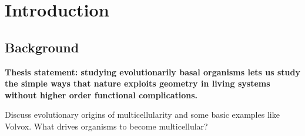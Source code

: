 
\chapter{Introduction} %

\ifpdf
    \graphicspath{{Chapter1/Figs/Raster/}{Chapter1/Figs/PDF/}{Chapter1/Figs/}}
\else
    \graphicspath{{Chapter1/Figs/Vector/}{Chapter1/Figs/}}
\fi


\section{Background} %

\textbf{Thesis statement: studying evolutionarily basal organisms lets us study the simple ways that nature exploits geometry in living systems without higher order functional complications.}

\begin{comment}

\nomenclature[z-cif]{$CIF$}{Cauchy's Integral Formula}                                %
\nomenclature[a-F]{$F$}{complex function}                                                   %
\nomenclature[g-p]{$\pi$}{ $\simeq 3.14\ldots$}                                             %
\nomenclature[g-i]{$\iota$}{unit imaginary number $\sqrt{-1}$}                      %
\nomenclature[g-g]{$\gamma$}{a simply closed curve on a complex plane}  %
\nomenclature[x-i]{$\oint_\gamma$}{integration around a curve $\gamma$} %
\nomenclature[r-j]{$j$}{superscript index}                                                       %
\nomenclature[s-0]{$0$}{subscript index}                                                        %
\end{comment}

Discuss evolutionary origins of multicellularity and some basic examples like Volvox. What drives organisms to become multicellular? 

